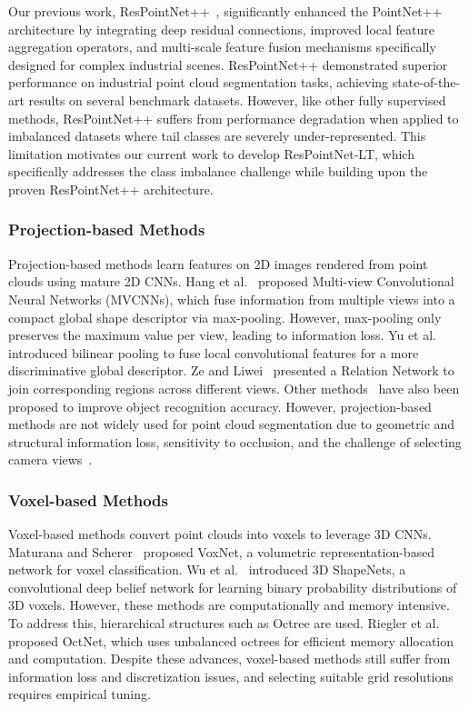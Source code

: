 \documentclass[preprint,12pt]{elsarticle}
\begin{document}
Our previous work, ResPointNet++~\cite{respointnet}, significantly enhanced the PointNet++ architecture by integrating deep residual connections, improved local feature aggregation operators, and multi-scale feature fusion mechanisms specifically designed for complex industrial scenes. ResPointNet++ demonstrated superior performance on industrial point cloud segmentation tasks, achieving state-of-the-art results on several benchmark datasets. However, like other fully supervised methods, ResPointNet++ suffers from performance degradation when applied to imbalanced datasets where tail classes are severely under-represented. This limitation motivates our current work to develop ResPointNet-LT, which specifically addresses the class imbalance challenge while building upon the proven ResPointNet++ architecture.

\subsubsection{Projection-based Methods}
Projection-based methods learn features on 2D images rendered from point clouds using mature 2D CNNs. Hang et al.~\cite{su2015mvcnn} proposed Multi-view Convolutional Neural Networks (MVCNNs), which fuse information from multiple views into a compact global shape descriptor via max-pooling. However, max-pooling only preserves the maximum value per view, leading to information loss. Yu et al.~\cite{yu2018multi} introduced bilinear pooling to fuse local convolutional features for a more discriminative global descriptor. Ze and Liwei~\cite{zhang2019relation} presented a Relation Network to join corresponding regions across different views. Other methods~\cite{wang2019dominant, feng2018gvcnn, shi2019pvcnn, liu2019relation} have also been proposed to improve object recognition accuracy. However, projection-based methods are not widely used for point cloud segmentation due to geometric and structural information loss, sensitivity to occlusion, and the challenge of selecting camera views~\cite{qi2016volumetric}.

\subsubsection{Voxel-based Methods}
Voxel-based methods convert point clouds into voxels to leverage 3D CNNs. Maturana and Scherer~\cite{maturana2015voxnet} proposed VoxNet, a volumetric representation-based network for voxel classification. Wu et al.~\cite{wu20153d} introduced 3D ShapeNets, a convolutional deep belief network for learning binary probability distributions of 3D voxels. However, these methods are computationally and memory intensive. To address this, hierarchical structures such as Octree are used. Riegler et al.~\cite{riegler2017octnet} proposed OctNet, which uses unbalanced octrees for efficient memory allocation and computation. Despite these advances, voxel-based methods still suffer from information loss and discretization issues, and selecting suitable grid resolutions requires empirical tuning.
\end{document}
